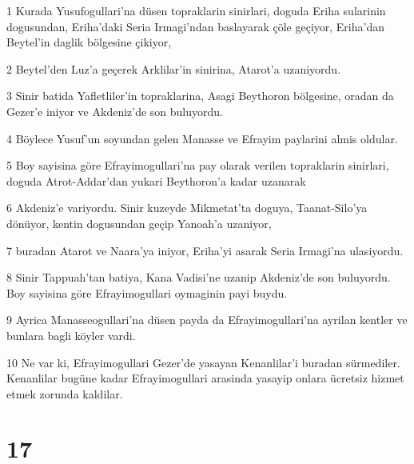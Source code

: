 \par 1 Kurada Yusufogullari'na düsen topraklarin sinirlari, doguda Eriha sularinin dogusundan, Eriha'daki Seria Irmagi'ndan baslayarak çöle geçiyor, Eriha'dan Beytel'in daglik bölgesine çikiyor,
\par 2 Beytel'den Luz'a geçerek Arklilar'in sinirina, Atarot'a uzaniyordu.
\par 3 Sinir batida Yafletliler'in topraklarina, Asagi Beythoron bölgesine, oradan da Gezer'e iniyor ve Akdeniz'de son buluyordu.
\par 4 Böylece Yusuf'un soyundan gelen Manasse ve Efrayim paylarini almis oldular.
\par 5 Boy sayisina göre Efrayimogullari'na pay olarak verilen topraklarin sinirlari, doguda Atrot-Addar'dan yukari Beythoron'a kadar uzanarak
\par 6 Akdeniz'e variyordu. Sinir kuzeyde Mikmetat'ta doguya, Taanat-Silo'ya dönüyor, kentin dogusundan geçip Yanoah'a uzaniyor,
\par 7 buradan Atarot ve Naara'ya iniyor, Eriha'yi asarak Seria Irmagi'na ulasiyordu.
\par 8 Sinir Tappuah'tan batiya, Kana Vadisi'ne uzanip Akdeniz'de son buluyordu. Boy sayisina göre Efrayimogullari oymaginin payi buydu.
\par 9 Ayrica Manasseogullari'na düsen payda da Efrayimogullari'na ayrilan kentler ve bunlara bagli köyler vardi.
\par 10 Ne var ki, Efrayimogullari Gezer'de yasayan Kenanlilar'i buradan sürmediler. Kenanlilar bugüne kadar Efrayimogullari arasinda yasayip onlara ücretsiz hizmet etmek zorunda kaldilar.

\chapter{17}

